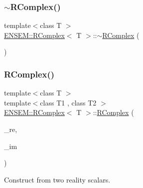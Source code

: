 \subsubsection{\texorpdfstring{$\sim$RComplex()}{~RComplex()}\hspace{0.1cm}{\footnotesize\ttfamily [3/3]}}
{\footnotesize\ttfamily template$<$class T $>$ \\
\mbox{\hyperlink{classENSEM_1_1RComplex}{E\+N\+S\+E\+M\+::\+R\+Complex}}$<$ T $>$\+::$\sim$\mbox{\hyperlink{classENSEM_1_1RComplex}{R\+Complex}} (\begin{DoxyParamCaption}{ }\end{DoxyParamCaption})\hspace{0.3cm}{\ttfamily [inline]}}

\mbox{\label{classENSEM_1_1RComplex_aec74e0e2dcf90ad4b575285662713b9c}} 
\subsubsection{\texorpdfstring{RComplex()}{RComplex()}\hspace{0.1cm}{\footnotesize\ttfamily [10/12]}}
{\footnotesize\ttfamily template$<$class T $>$ \\
template$<$class T1 , class T2 $>$ \\
\mbox{\hyperlink{classENSEM_1_1RComplex}{E\+N\+S\+E\+M\+::\+R\+Complex}}$<$ T $>$\+::\mbox{\hyperlink{classENSEM_1_1RComplex}{R\+Complex}} (\begin{DoxyParamCaption}\item[{const \mbox{\hyperlink{classENSEM_1_1RScalar}{R\+Scalar}}$<$ T1 $>$ \&}]{\+\_\+re,  }\item[{const \mbox{\hyperlink{classENSEM_1_1RScalar}{R\+Scalar}}$<$ T2 $>$ \&}]{\+\_\+im }\end{DoxyParamCaption})\hspace{0.3cm}{\ttfamily [inline]}}



Construct from two reality scalars. 

\mbox{\label{classENSEM_1_1RComplex_aa67055e36f9e7d7709eb98453901b0ba}} 
